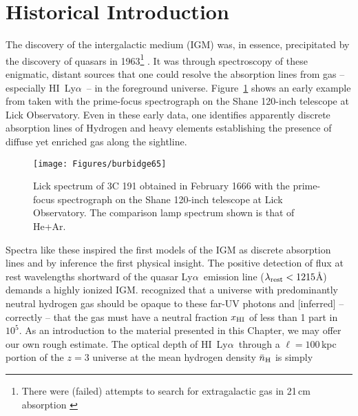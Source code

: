 \documentclass[graybox]{svmult}
\newcommand{\HI}{H{\sc I}}
\def\lya{Ly$\alpha$}
\begin{document}
\section{Historical Introduction}
\label{sec:history}

The discovery of the intergalactic medium (IGM)
was, in essence, precipitated by the discovery of 
quasars in 1963\footnote{There were (failed) attempts
to search for extragalactic gas in 21\,cm absorption
\cite{field59}} \cite{schmidt63}.
It was through spectroscopy of these enigmatic, distant
sources that one could resolve the absorption lines
from gas -- especially \HI\ \lya\ -- 
in the foreground universe.  
Figure~\ref{fig:burb} shows an early example from
\cite{blb66} taken with the prime-focus spectrograph
on the Shane 120-inch telescope at Lick Observatory.
Even in these early data, one identifies apparently
discrete absorption lines of Hydrogen and heavy
elements establishing the presence of diffuse yet
enriched gas along the sightline.



%
\begin{figure}[b]
\sidecaption
\texttt{[image: Figures/burbidge65]}
%
%
\caption{Lick spectrum of 3C 191 obtained in February 1666
with the prime-focus spectrograph on the Shane 120-inch
telescope at Lick Observatory.  The comparison lamp spectrum
shown is that of He+Ar.
}
\label{fig:burb}       %
\end{figure}


Spectra like these inspired the first models of
the IGM as discrete absorption lines \cite{bs66}
and by inference the first physical insight.
The positive detection of flux at rest wavelengths
shortward of the quasar \lya\ emission line
($\lambda_{\rm rest} < 1215$\AA)
demands a highly ionized IGM.
\cite{gp65} recognized that a universe with predominantly
neutral hydrogen gas should be opaque to these far-UV
photons and [inferred] -- correctly -- 
that the gas must have a neutral fraction $x_{\rm HI}$ of less 
than 1 part in $10^5$.
As an introduction to the material presented in this Chapter,
we may offer our own rough estimate.
The optical depth of \HI\ \lya\ through
a $\ell = 100$\,kpc portion of the $z=3$ universe
at the mean hydrogen density $\bar n_{\rm H}$ 
is simply
\end{document}
